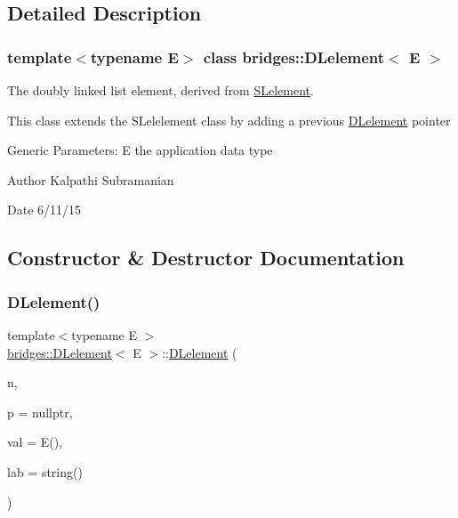 \subsection{Detailed Description}
\subsubsection*{template$<$typename E$>$\newline
class bridges\+::\+D\+Lelement$<$ E $>$}

The doubly linked list element, derived from \mbox{\hyperlink{classbridges_1_1_s_lelement}{S\+Lelement}}. 

This class extends the S\+Lelelement class by adding a previous \mbox{\hyperlink{classbridges_1_1_d_lelement}{D\+Lelement}} pointer

Generic Parameters\+: E the application data type

\begin{DoxyAuthor}{Author}
Kalpathi Subramanian 
\end{DoxyAuthor}
\begin{DoxyDate}{Date}
6/11/15 
\end{DoxyDate}


\subsection{Constructor \& Destructor Documentation}
\mbox{\label{classbridges_1_1_d_lelement_a846424760c641ba5f496615361d8f79c}} 
\subsubsection{\texorpdfstring{D\+Lelement()}{DLelement()}\hspace{0.1cm}{\footnotesize\ttfamily [1/2]}}
{\footnotesize\ttfamily template$<$typename E $>$ \\
\mbox{\hyperlink{classbridges_1_1_d_lelement}{bridges\+::\+D\+Lelement}}$<$ E $>$\+::\mbox{\hyperlink{classbridges_1_1_d_lelement}{D\+Lelement}} (\begin{DoxyParamCaption}\item[{\mbox{\hyperlink{classbridges_1_1_d_lelement}{D\+Lelement}}$<$ E $>$ $\ast$}]{n,  }\item[{\mbox{\hyperlink{classbridges_1_1_d_lelement}{D\+Lelement}}$<$ E $>$ $\ast$}]{p = {\ttfamily nullptr},  }\item[{const E \&}]{val = {\ttfamily E()},  }\item[{const string \&}]{lab = {\ttfamily string()} }\end{DoxyParamCaption})\hspace{0.3cm}{\ttfamily [inline]}}

